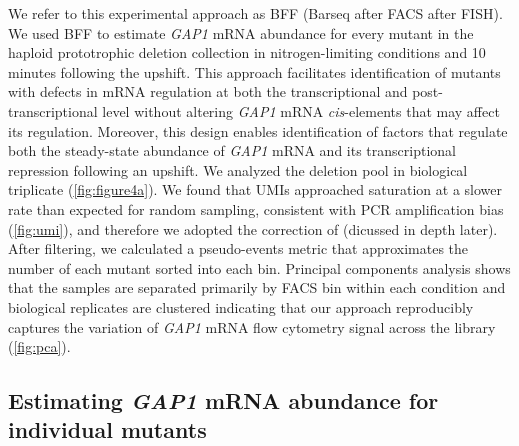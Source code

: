 We refer to this experimental approach as BFF (Barseq after FACS after FISH). 
We used BFF to estimate \textit{GAP1} mRNA abundance for every mutant in the
haploid prototrophic deletion collection
\parencite{vandersluis2014broad} in
nitrogen-limiting conditions and 10 minutes following the upshift. 
This approach facilitates identification of mutants with
defects in mRNA regulation at both the transcriptional and
post-transcriptional level without altering \textit{GAP1} mRNA 
\textit{cis}-elements that may affect its regulation. 
Moreover, this design enables identification of factors that 
regulate both the steady-state abundance of \textit{GAP1} mRNA and 
its transcriptional repression following an upshift.
We analyzed the deletion pool in biological triplicate
(\autoref{fig:figure4a}). We found that UMIs 
approached saturation at a slower rate than expected for random sampling,
consistent with PCR amplification bias 
(\autoref{fig:umi}), and therefore we adopted the 
correction of \cite{fu2011counting} (dicussed in depth later). 
After filtering, we calculated a
pseudo-events metric that approximates the number of each mutant sorted
into each bin. 
Principal components analysis shows that the samples are 
separated primarily by FACS bin within each
condition and biological replicates are clustered indicating that our
approach reproducibly captures the variation of  \textit{GAP1} mRNA flow
cytometry signal across the library (\autoref{fig:pca}). 




\subsection{Estimating \textit{GAP1} mRNA abundance for individual mutants}

